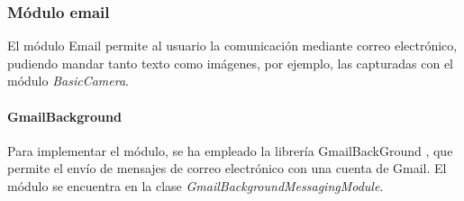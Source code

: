 \subsubsection{Módulo email}
El módulo Email permite al usuario la comunicación mediante correo electrónico, pudiendo mandar tanto texto como imágenes, por ejemplo, las capturadas con el módulo \textit{BasicCamera}.

\paragraph*{GmailBackground\\}
Para implementar el módulo, se ha empleado la librería GmailBackGround \cite{gmailbg}, que permite el envío de mensajes de correo electrónico con una cuenta de Gmail. El módulo se encuentra en la clase \textit{GmailBackgroundMessagingModule}.
\newpage








